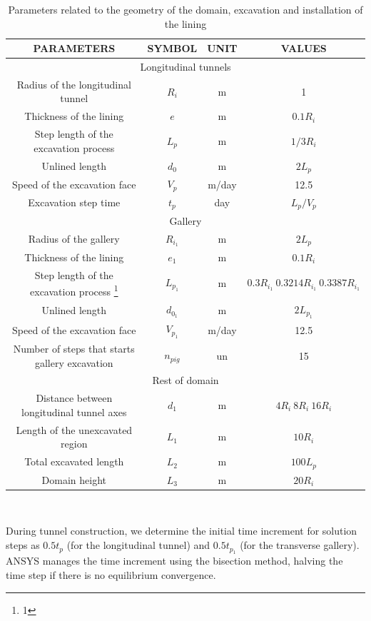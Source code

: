 \documentclass[a4paper,fleqn]{cas-sc}
\begin{document}
\begin{table}
	\caption{Parameters related to the geometry of the domain, excavation and installation of the lining}
	\label{table1}
	\centering
	\renewcommand{\arraystretch}{1.25}
	\begin{tabular}{c c c c}
		\hline
		\multicolumn{1}{c}{PARAMETERS} &
		\multicolumn{1}{c}{SYMBOL} &
		\multicolumn{1}{c}{UNIT} &
		\multicolumn{1}{c}{VALUES} \\
		\hline
		\multicolumn{4}{c}{Longitudinal tunnels} \\
		\hline
		Radius of the longitudinal tunnel & $R_i$ & m & 1 \\
		Thickness of the lining & $e$ & m & $0.1R_i$ \\
		Step length of the excavation process & $L_p$ & m & $1/3R_i$ \\
		Unlined length & $d_0$ & m & $2L_p$ \\
		Speed of the excavation face & $V_p$ & m/day & 12.5 \\
		Excavation step time & $t_p$ & day & $L_p/V_p$ \\
		\hline
		\multicolumn{4}{c}{Gallery} \\
		\hline
		Radius of the gallery & $R_{i_1}$ & m & $2L_p$ \\
		Thickness of the lining & $e_1$ & m & $0.1R_i$ \\
		Step length of the excavation process \footnote{1} & $L_{p_1}$ & m & $0.3R_{i_1} ~0.3214R_{i_1} ~0.3387R_{i_1}$ \\
		Unlined length & $d_{0_1}$ & m & $2L_{p_1}$ \\
		Speed of the excavation face & $V_{p_1}$ & m/day & 12.5 \\
		Number of steps that starts gallery excavation & $n_{pig}$ & un & 15 \\
		\hline
		\multicolumn{4}{c}{Rest of domain} \\
		\hline
		Distance between longitudinal tunnel axes & $d_1$ & m & $4R_i ~8R_i ~16R_i$ \\
		Length of the unexcavated region & $L_1$ & m & $10R_i$ \\
		Total excavated length & $L_2$ & m & $100L_p$ \\
		Domain height & $L_3$ & m & $20R_i$ \\
		\hline
	\end{tabular}
	\normalsize
	\\ 
\end{table}
\FloatBarrier
During tunnel construction, we determine the initial time increment for solution steps as $0.5t_p$ (for the longitudinal tunnel) and $0.5t_{p_1}$ (for the transverse gallery). ANSYS manages the time increment using the bisection method, halving the time step if there is no equilibrium convergence.
\end{document}
